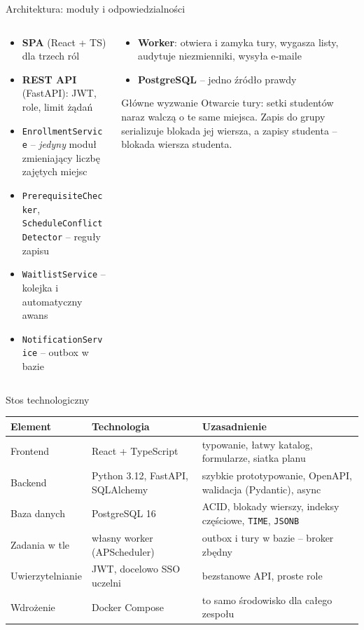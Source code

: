 \documentclass[aspectratio=169,11pt]{beamer}
\begin{document}
\begin{frame}{Architektura: moduły i odpowiedzialności}
  \begin{columns}[T]
    \begin{column}{0.5\textwidth}
      \small
      \begin{itemize}
        \item \textbf{SPA} (React + TS) dla trzech ról
        \item \textbf{REST API} (FastAPI): JWT, role, limit żądań
        \item \texttt{EnrollmentService} -- \emph{jedyny} moduł zmieniający liczbę zajętych miejsc
        \item \texttt{PrerequisiteChecker}, \texttt{ScheduleConflictDetector} -- reguły zapisu
        \item \texttt{WaitlistService} -- kolejka i automatyczny awans
        \item \texttt{NotificationService} -- outbox w bazie
      \end{itemize}
    \end{column}
    \begin{column}{0.46\textwidth}
      \small
      \begin{itemize}
        \item \textbf{Worker}: otwiera i zamyka tury, wygasza listy, audytuje niezmienniki, wysyła e-maile
        \item \textbf{PostgreSQL} -- jedno źródło prawdy
      \end{itemize}
      \begin{alertblock}{Główne wyzwanie}
        Otwarcie tury: setki studentów naraz walczą o te same miejsca.
        Zapis do grupy serializuje blokada jej wiersza, a zapisy studenta -- blokada wiersza studenta.
      \end{alertblock}
    \end{column}
  \end{columns}
\end{frame}

\begin{frame}{Stos technologiczny}
  \small
  \begin{tabularx}{\textwidth}{@{}l>{\raggedright}p{4.4cm}L@{}}
    \toprule
    \textbf{Element} & \textbf{Technologia} & \textbf{Uzasadnienie} \\
    \midrule
    Frontend & React + TypeScript & typowanie, łatwy katalog, formularze, siatka planu \\
    Backend & Python 3.12, FastAPI, SQLAlchemy & szybkie prototypowanie, OpenAPI, walidacja (Pydantic), async \\
    Baza danych & PostgreSQL 16 & ACID, blokady wierszy, indeksy częściowe, \texttt{TIME}, \texttt{JSONB} \\
    Zadania w tle & własny worker (APScheduler) & outbox i tury w bazie -- broker zbędny \\
    Uwierzytelnianie & JWT, docelowo SSO uczelni & bezstanowe API, proste role \\
    Wdrożenie & Docker Compose & to samo środowisko dla całego zespołu \\
    \bottomrule
  \end{tabularx}
\end{frame}
\end{document}
